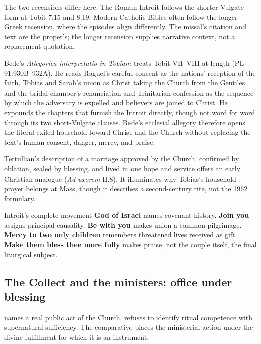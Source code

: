 The two recensions differ here. The Roman Introit follows the shorter Vulgate form at Tobit 7:15 and 8:19. Modern Catholic Bibles often follow the longer Greek recension, where the episodes align differently. The missal's citation and text are the proper's; the longer recension supplies narrative context, not a replacement quotation.

Bede's \emph{Allegorica interpretatio in Tobiam} treats Tobit VII--VIII at length (PL 91:930B--932A). He reads Raguel's careful consent as the nations' reception of the faith, Tobias and Sarah's union as Christ taking the Church from the Gentiles, and the bridal chamber's renunciation and Trinitarian confession as the sequence by which the adversary is expelled and believers are joined to Christ. He expounds the chapters that furnish the Introit directly, though not word for word through its two short-Vulgate clauses. Bede's ecclesial allegory therefore opens the literal exiled household toward Christ and the Church without replacing the text's human consent, danger, mercy, and praise.

Tertullian's description of a marriage approved by the Church, confirmed by oblation, sealed by blessing, and lived in one hope and service offers an early Christian analogue (\emph{Ad uxorem} II.8). It illuminates why Tobias's household prayer belongs at Mass, though it describes a second-century rite, not the 1962 formulary.

\begin{sourcecard}{Introit's complete movement}
\textbf{God of Israel} names covenant history. \textbf{Join you} assigns principal causality. \textbf{Be with you} makes union a common pilgrimage. \textbf{Mercy to two only children} remembers threatened lives received as gift. \textbf{Make them bless thee more fully} makes praise, not the couple itself, the final liturgical subject.
\end{sourcecard}

\sectionguard
\subsection*{The Collect and the ministers: office under blessing\enspace{}}

 names a real public act of the Church.  refuses to identify ritual competence with supernatural sufficiency. The comparative  places the ministerial action under the divine fulfillment for which it is an instrument.

